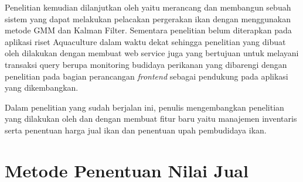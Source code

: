Penelitian \citep{bagus2022} kemudian dilanjutkan oleh \citep{hafiz2021} yaitu merancang dan membangun sebuah sistem yang dapat melakukan pelacakan pergerakan ikan dengan menggunakan metode GMM dan Kalman Filter. Sementara penelitian \citep{fadhil2021} belum diterapkan pada aplikasi riset Aquaculture dalam waktu dekat sehingga penelitian yang dibuat oleh \citep{andri2022} dilakukan dengan membuat web service juga yang bertujuan untuk melayani transaksi query berupa monitoring budidaya perikanan yang dibarengi dengan penelitian \citep{gian2022} pada bagian perancangan \textit{frontend} sebagai pendukung pada aplikasi yang dikembangkan.

Dalam penelitian yang sudah berjalan ini, penulis mengembangkan penelitian yang dilakukan oleh \citep{andri2022} dan \citep{gian2022} dengan membuat fitur baru yaitu manajemen inventaris serta penentuan harga jual ikan dan penentuan upah pembudidaya ikan.

\section{Metode Penentuan Nilai Jual}



